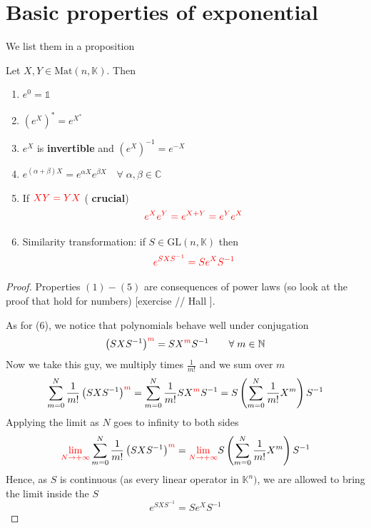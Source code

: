 \documentclass[../main.tex]{subfiles}
\begin{document}
\section{Basic properties of exponential}
We list them in a proposition
\begin{proposition}
Let $X,Y\in\textrm{Mat}(n,\mathbb{K})$. Then
\renewcommand{\labelenumi}{\arabic{enumi})}
\begin{enumerate}
    \item $e^0=\mathbb{1}$
    \item $\left(e^X\right)^\ast=e^{X^\ast}$
    \item $e^X$ is \textbf{invertible} and $\left(e^X\right)^{-1}=e^{-X}$
    \item $e^{(\alpha+\beta)X}=e^{\alpha X}e^{\beta X} \quad \forall\;\alpha,\beta\in\mathbb{C}$
    \item{}If ${\color{red}XY=YX}$ ({\selectfont{}\relax} \textbf{crucial})
    \[
    {\color{red}e^Xe^Y=e^{X+Y}=e^Ye^X}
    \]
    \item Similarity transformation: if $S\in\textrm{GL}(n,\mathbb{K})$ then
    \[
    {\color{red}e^{SXS^{-1}}=Se^XS^{-1}}
    \]
\end{enumerate}
\end{proposition}
\begin{proof}
Properties $(1)-(5)$ are consequences of power laws (so look at the proof that hold for numbers) [exercise // Hall ].

As for (6), we notice that polynomials behave well under conjugation
\[
\left(SXS^{-1}\right)^{{\color{red}m}}=SX^{{\color{red}m}}S^{-1} \qquad \forall \;m\in\mathbb{N}
\]
Now we take this guy, we multiply times $\frac{1}{m!}$ and we sum over $m$
\[
\sum_{m=0}^N\frac{1}{m!}\left(SXS^{-1}\right)^{{\color{red}m}}=\sum_{m=0}^N\frac{1}{m!}SX^{{\color{red}m}}S^{-1}=S\left(\sum_{m=0}^N\frac{1}{m!}X^m\right)S^{-1}
\]
Applying the limit as $N$ goes to infinity to both sides
\[
{\color{red}\lim_{N\to+\infty}}\sum_{m=0}^N\frac{1}{m!}\left(SXS^{-1}\right)^{{\color{red}m}}={\color{red}\lim_{N\to+\infty}}S\left(\sum_{m=0}^N\frac{1}{m!}X^m\right)S^{-1}
\]
Hence, as $S$ is continuous (as every linear operator in $\mathbb{K}^n)$, we are allowed to bring the limit inside the $S$
\[
e^{SXS^{-1}}=Se^XS^{-1}
\]
\end{proof}
\end{document}
